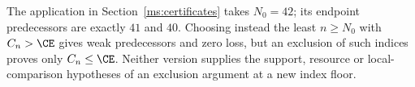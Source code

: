 The application in Section~\ref{ms:certificates} takes $N_0=42$; its
endpoint predecessors are exactly $41$ and $40$. Choosing instead the
least $n\ge N_0$ with $C_n>\CE$ gives weak predecessors and zero loss,
but an exclusion of such indices proves only $C_n\le\CE$.
Neither version supplies the support, resource or local-comparison
hypotheses of an exclusion argument at a new index floor.
